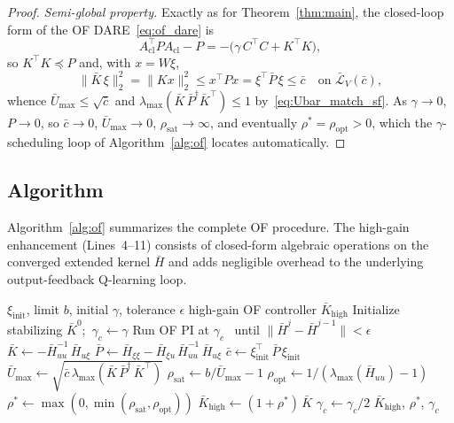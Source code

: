 \documentclass[final,5p,times,authoryear]{elsarticle}
\theoremstyle{plain}
\theoremstyle{definition}
\theoremstyle{remark}
\begin{document}
\begin{proof}
\emph{Semi-global property.}  Exactly as for Theorem~\ref{thm:main},
the closed-loop form of the OF DARE~\eqref{eq:of_dare} is
\begin{equation}
A_{\mathrm{cl}}^{\!\top} P A_{\mathrm{cl}} - P
   = -\bigl(\gamma\,C^{\!\top}\!C + K^{\!\top}\!K\bigr),
\label{eq:of_cl_lyap}
\end{equation}
so $K^{\!\top}\!K \preceq P$ and, with $x = W\xi$,
\begin{equation}
\|\bar K\,\xi\|_2^2 = \|Kx\|_2^2 \leq x^{\!\top}\!P x
   = \xi^{\!\top}\bar P\,\xi \leq \bar c
\quad \text{on } \bar{\mathcal L}_V(\bar c),
\label{eq:of_Umax_bound}
\end{equation}
whence $\bar U_{\max} \leq \sqrt{\bar c}$ and
$\lambda_{\max}(\bar K\,\bar P^{\dagger}\bar K^{\!\top}) \leq 1$
by~\eqref{eq:Ubar_match_sf}.  As $\gamma \to 0$, $P \to 0$, so
$\bar c \to 0$, $\bar U_{\max} \to 0$,
$\rho_{\mathrm{sat}} \to \infty$, and eventually
$\rho^{*} = \rho_{\mathrm{opt}} > 0$, which the $\gamma$-scheduling
loop of Algorithm~\ref{alg:of} locates automatically.
\end{proof}

\subsection{Algorithm}\label{sec:of_algorithm}

Algorithm~\ref{alg:of} summarizes the complete OF procedure.  The
high-gain enhancement (Lines~4--11) consists of closed-form algebraic
operations on the converged extended kernel $\bar H$ and adds
negligible overhead to the underlying output-feedback Q-learning loop.

\begin{algorithm}[!htb]
\caption{Model-Free Low-and-High Gain Output-Feedback Q-Learning}
\label{alg:of}
{\footnotesize
\begin{algorithmic}[1]
\Require $\xi_{\mathrm{init}}$, limit $b$, initial $\gamma$, tolerance $\epsilon$
\Ensure  high-gain OF controller $\bar K_{\mathrm{high}}$
\State Initialize stabilizing $\bar K^{0}$;\ $\gamma_c \leftarrow \gamma$
\Repeat
    \State Run OF PI \citep[Alg.~2.1]{RizviLin2023book} at $\gamma_c$
    \Statex \quad\, until $\|\bar H^{j} - \bar H^{j-1}\| < \epsilon$
    \State $\bar K \leftarrow -\bar H_{uu}^{-1}\,\bar H_{u\xi}$
    \State $\bar P \leftarrow \bar H_{\xi\xi} - \bar H_{\xi u}\,\bar H_{uu}^{-1}\,\bar H_{u\xi}$
    \State $\bar c \leftarrow \xi_{\mathrm{init}}^{\!\top}\,\bar P\,\xi_{\mathrm{init}}$
    \State $\bar U_{\max} \leftarrow \sqrt{\bar c\,\lambda_{\max}(\bar K\,\bar P^{\dagger}\,\bar K^{\!\top})}$
    \State $\rho_{\mathrm{sat}} \leftarrow b/\bar U_{\max} - 1$
    \State $\rho_{\mathrm{opt}} \leftarrow 1/(\lambda_{\max}(\bar H_{uu}) - 1)$
    \State $\rho^{*} \leftarrow \max(0,\min(\rho_{\mathrm{sat}},\rho_{\mathrm{opt}}))$
    \State $\bar K_{\mathrm{high}} \leftarrow (1 + \rho^{*})\,\bar K$
        \State $\gamma_c \leftarrow \gamma_c / 2$
    \EndIf
{}
\State \Return $\bar K_{\mathrm{high}}$, $\rho^{*}$, $\gamma_c$
\end{algorithmic}}
\end{algorithm}
\end{document}
